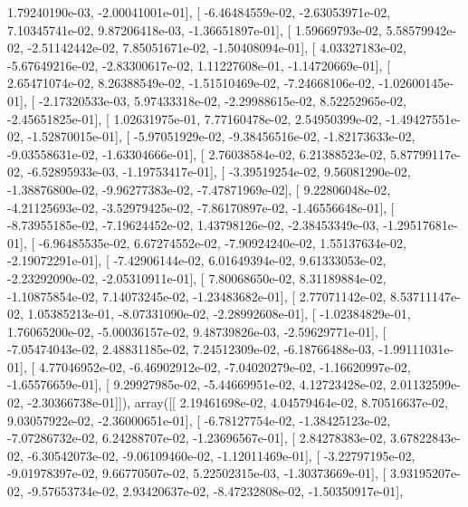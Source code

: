 \documentclass{article}
\begin{document}
          1.79240190e-03,  -2.00041001e-01],
       [ -6.46484559e-02,  -2.63053971e-02,   7.10345741e-02,
          9.87206418e-03,  -1.36651897e-01],
       [  1.59669793e-02,   5.58579942e-02,  -2.51142442e-02,
          7.85051671e-02,  -1.50408094e-01],
       [  4.03327183e-02,  -5.67649216e-02,  -2.83300617e-02,
          1.11227608e-01,  -1.14720669e-01],
       [  2.65471074e-02,   8.26388549e-02,  -1.51510469e-02,
         -7.24668106e-02,  -1.02600145e-01],
       [ -2.17320533e-03,   5.97433318e-02,  -2.29988615e-02,
          8.52252965e-02,  -2.45651825e-01],
       [  1.02631975e-01,   7.77160478e-02,   2.54950399e-02,
         -1.49427551e-02,  -1.52870015e-01],
       [ -5.97051929e-02,  -9.38456516e-02,  -1.82173633e-02,
         -9.03558631e-02,  -1.63304666e-01],
       [  2.76038584e-02,   6.21388523e-02,   5.87799117e-02,
         -6.52895933e-03,  -1.19753417e-01],
       [ -3.39519254e-02,   9.56081290e-02,  -1.38876800e-02,
         -9.96277383e-02,  -7.47871969e-02],
       [  9.22806048e-02,  -4.21125693e-02,  -3.52979425e-02,
         -7.86170897e-02,  -1.46556648e-01],
       [ -8.73955185e-02,  -7.19624452e-02,   1.43798126e-02,
         -2.38453349e-03,  -1.29517681e-01],
       [ -6.96485535e-02,   6.67274552e-02,  -7.90924240e-02,
          1.55137634e-02,  -2.19072291e-01],
       [ -7.42906144e-02,   6.01649394e-02,   9.61333053e-02,
         -2.23292090e-02,  -2.05310911e-01],
       [  7.80068650e-02,   8.31189884e-02,  -1.10875854e-02,
          7.14073245e-02,  -1.23483682e-01],
       [  2.77071142e-02,   8.53711147e-02,   1.05385213e-01,
         -8.07331090e-02,  -2.28992608e-01],
       [ -1.02384829e-01,   1.76065200e-02,  -5.00036157e-02,
          9.48739826e-03,  -2.59629771e-01],
       [ -7.05474043e-02,   2.48831185e-02,   7.24512309e-02,
         -6.18766488e-03,  -1.99111031e-01],
       [  4.77046952e-02,  -6.46902912e-02,  -7.04020279e-02,
         -1.16620997e-02,  -1.65576659e-01],
       [  9.29927985e-02,  -5.44669951e-02,   4.12723428e-02,
          2.01132599e-02,  -2.30366738e-01]]), array([[  2.19461698e-02,   4.04579464e-02,   8.70516637e-02,
          9.03057922e-02,  -2.36000651e-01],
       [ -6.78127754e-02,  -1.38425123e-02,  -7.07286732e-02,
          6.24288707e-02,  -1.23696567e-01],
       [  2.84278383e-02,   3.67822843e-02,  -6.30542073e-02,
         -9.06109460e-02,  -1.12011469e-01],
       [ -3.22797195e-02,  -9.01978397e-02,   9.66770507e-02,
          5.22502315e-03,  -1.30373669e-01],
       [  3.93195207e-02,  -9.57653734e-02,   2.93420637e-02,
         -8.47232808e-02,  -1.50350917e-01],
\end{document}
